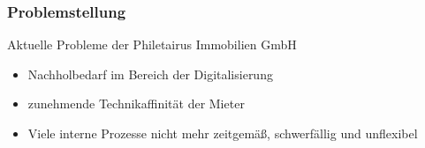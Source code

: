\begin{frame}
  \frametitle{Problemstellung}

  \begin{alertblock}{Aktuelle Probleme der Philetairus Immobilien GmbH}
 	\begin{itemize}
	\item Nachholbedarf im Bereich der Digitalisierung
	 \item zunehmende Technikaffinität der Mieter
	\item Viele interne Prozesse nicht mehr zeitgemäß, schwerfällig und unflexibel
	\end{itemize}
  \end{alertblock}
\end{frame}